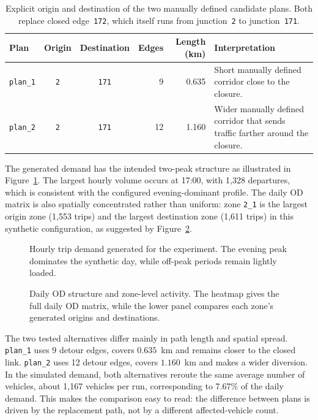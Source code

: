 \begin{table}[H]
\centering
\begin{tabularx}{\textwidth}{@{}lccrrX@{}}
\toprule
Plan & Origin & Destination & Edges & Length (km) & Interpretation \\
\midrule
\texttt{plan\_1} & \texttt{2} & \texttt{171} & 9 & 0.635 &
Short manually defined corridor close to the closure. \\
\texttt{plan\_2} & \texttt{2} & \texttt{171} & 12 & 1.160 &
Wider manually defined corridor that sends traffic farther around the
closure. \\
\bottomrule
\end{tabularx}
\caption{Explicit origin and destination of the two manually defined
candidate plans. Both replace closed edge~\texttt{172}, which itself runs
from junction~\texttt{2} to junction~\texttt{171}.}
\label{tab:results_manual_plan_inventory}
\end{table}

The generated demand has the intended two-peak structure as illustrated in
Figure~\ref{fig:results_hourly_demand}. The largest hourly
volume occurs at 17:00, with 1,328 departures, which is consistent with the
configured evening-dominant profile. The daily OD matrix is also spatially
concentrated rather than uniform: zone \texttt{2\_1} is the largest
origin zone (1,553 trips) and the largest destination zone (1,611 trips) in
this synthetic configuration, as suggested by Figure~\ref{fig:results_od_zone_activity}.

\begin{figure}[H]
  \centering
  \caption{Hourly trip demand generated for the experiment. The evening peak
  dominates the synthetic day, while off-peak periods remain lightly loaded.}
  \label{fig:results_hourly_demand}
\end{figure}

\begin{figure}[H]
  \centering
  \caption{Daily OD structure and zone-level activity. The heatmap gives the
  full daily OD matrix, while the lower panel compares each zone's generated
  origins and destinations.}
  \label{fig:results_od_zone_activity}
\end{figure}

The two tested alternatives differ mainly in path length and spatial spread.
\texttt{plan\_1} uses 9 detour edges, covers $0.635$~km and remains closer
to the closed link. \texttt{plan\_2} uses 12 detour edges, covers
$1.160$~km and makes a wider diversion. In the
simulated demand, both alternatives reroute the same average number of
vehicles, about 1,167 vehicles per run, corresponding to 7.67\% of the daily
demand. This makes the comparison easy to read: the difference between plans
is driven by the replacement path, not by a different affected-vehicle count.

